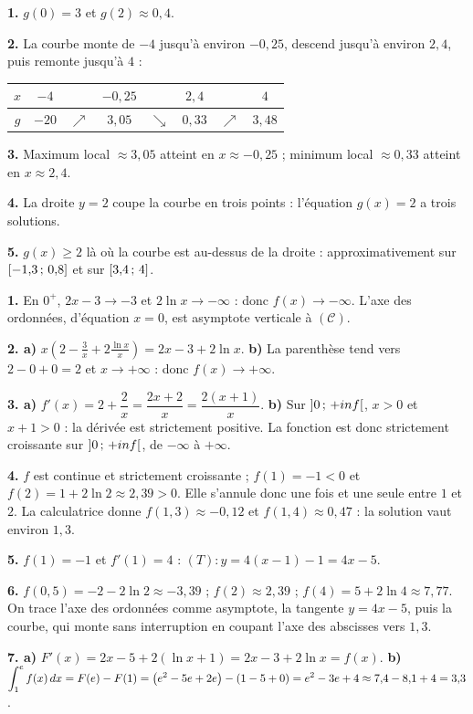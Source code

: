 \begin{corrige}
\textbf{1.} $g(0) = 3$ et $g(2) \approx 0{,}4$.

\textbf{2.} La courbe monte de $-4$ jusqu'à environ $-0{,}25$, descend
jusqu'à environ $2{,}4$, puis remonte jusqu'à $4$ :

\begin{center}\footnotesize
\begin{tabular}{|c|ccccccc|}
\hline
$x$ & $-4$ & & $-0{,}25$ & & $2{,}4$ & & $4$\\
\hline
$g$ & $-20$ & $\nearrow$ & $3{,}05$ & $\searrow$ & $0{,}33$ & $\nearrow$ &
$3{,}48$\\
\hline
\end{tabular}
\end{center}

\textbf{3.} Maximum local $\approx 3{,}05$ atteint en $x \approx -0{,}25$ ;
minimum local $\approx 0{,}33$ atteint en $x \approx 2{,}4$.

\textbf{4.} La droite $y = 2$ coupe la courbe en trois points : l'équation
$g(x) = 2$ a trois solutions.

\textbf{5.} $g(x) \geq 2$ là où la courbe est au-dessus de la droite :
approximativement sur $\left[-1{,}3\,;\,0{,}8\right]$ et sur
$\left[3{,}4\,;\,4\right]$.
\end{corrige}

\begin{corrige}
\textbf{1.} En $0^{+}$, $2x-3 \to -3$ et $2\ln x \to -\infty$ : donc
$f(x) \to -\infty$. L'axe des ordonnées, d'équation $x = 0$, est asymptote
verticale à $(\mathcal C)$.

\textbf{2. a)} $x\left(2-\frac3x+2\frac{\ln x}{x}\right) = 2x-3+2\ln x$.
\checkmark
\textbf{b)} La parenthèse tend vers $2-0+0 = 2$ et $x \to +\infty$ : donc
$f(x) \to +\infty$.

\textbf{3. a)} $f'(x) = 2+\dfrac2x = \dfrac{2x+2}{x} = \dfrac{2(x+1)}{x}$.
\textbf{b)} Sur $\left]0\,;\,+inf\right[$, $x>0$ et $x+1>0$ : la dérivée
est strictement positive. La fonction est donc strictement croissante sur
$\left]0\,;\,+inf\right[$, de $-\infty$ à $+\infty$.

\textbf{4.} $f$ est continue et strictement croissante ; $f(1) = -1<0$ et
$f(2) = 1+2\ln2 \approx 2{,}39>0$. Elle s'annule donc une fois et une seule
entre $1$ et $2$. La calculatrice donne $f(1{,}3) \approx -0{,}12$ et
$f(1{,}4) \approx 0{,}47$ : la solution vaut environ $1{,}3$.

\textbf{5.} $f(1) = -1$ et $f'(1) = 4$ : $(T) : y = 4(x-1)-1 = 4x-5$.

\textbf{6.} $f(0{,}5) = -2-2\ln2 \approx -3{,}39$ ;
$f(2) \approx 2{,}39$ ; $f(4) = 5+2\ln4 \approx 7{,}77$. On trace l'axe des
ordonnées comme asymptote, la tangente $y = 4x-5$, puis la courbe, qui monte
sans interruption en coupant l'axe des abscisses vers $1{,}3$.

\textbf{7. a)} $F'(x) = 2x-5+2\left(\ln x+1\right) = 2x-3+2\ln x = f(x)$.
\checkmark
\textbf{b)} $\displaystyle\int_{1}^{e} f(x)\,dx = F(e)-F(1)
= \left(e^{2}-5e+2e\right)-\left(1-5+0\right) = e^{2}-3e+4
\approx 7{,}4-8{,}1+4 = 3{,}3$.
\end{corrige}

